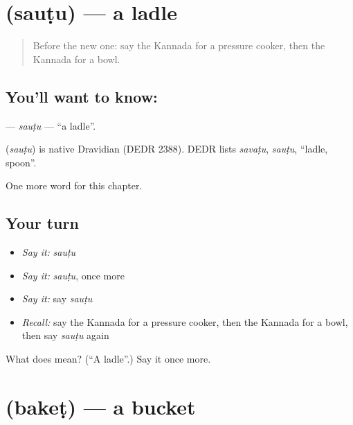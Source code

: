 \section[\texorpdfstring{\kn{ಸೌಟು} (sauṭu)}{ಸೌಟು (sauṭu)}]{ (sauṭu) — a ladle}

\label{lesson:KA-C183-sautu}



\begin{quote}
Before the new one: say the Kannada for a pressure cooker, then the Kannada for a bowl.
\end{quote}

\subsection*{You'll want to know: }
\textbf{} — \emph{sauṭu} — \textquotedblleft{}a ladle\textquotedblright{}.

\begin{cousinweb}
\textbf{} (\emph{sauṭu}) is native Dravidian (DEDR 2388). DEDR lists \emph{savaṭu}, \emph{sauṭu}, \textquotedblleft{}ladle, spoon\textquotedblright{}.
\end{cousinweb}

\begin{grammarlens}[title={What you've built}]
One more word for this chapter.
\end{grammarlens}

\subsection*{Your turn}
\begin{itemize}
\raggedright
  \item \emph{Say it:} \emph{sauṭu}
  \item \emph{Say it:} \emph{sauṭu}, once more
  \item \emph{Say it:} say \emph{sauṭu}
  \item \emph{Recall:} say the Kannada for a pressure cooker, then the Kannada for a bowl, then say \emph{sauṭu} again
\end{itemize}

\begin{tcolorbox}[breakable,colback=teal!4,colframe=teal!35!black,title={Before you move on}]
What does  mean? (\textquotedblleft{}A ladle\textquotedblright{}.) Say it once more.
\end{tcolorbox}
\section[\texorpdfstring{\kn{ಬಕೆಟ್} (bakeṭ)}{ಬಕೆಟ್ (bakeṭ)}]{ (bakeṭ) — a bucket}

